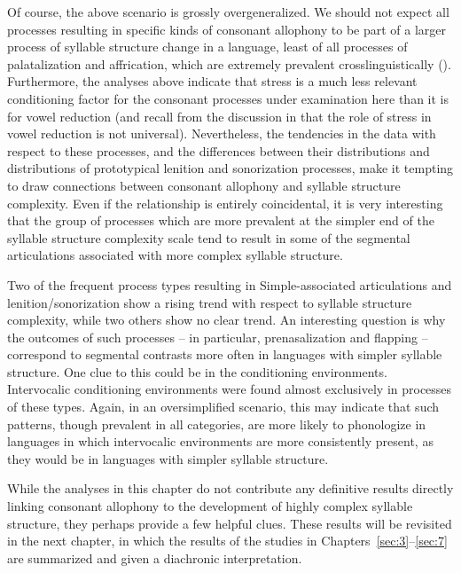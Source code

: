   Of course, the above scenario is grossly overgeneralized. We should not expect all processes resulting in specific kinds of consonant allophony to be part of a larger process of syllable structure change in a language, least of all processes of palatalization and affrication, which are extremely prevalent crosslinguistically (\citealt{Bhat1978,Bateman2007}). Furthermore, the analyses above indicate that stress is a much less relevant conditioning factor for the consonant processes under examination here than it is for vowel reduction (and recall from the discussion in  that the role of stress in vowel reduction is not universal). Nevertheless, the tendencies in the data with respect to these processes, and the differences between their distributions and distributions of prototypical lenition and sonorization processes, make it tempting to draw connections between consonant allophony and syllable structure complexity. Even if the relationship is entirely coincidental, it is very interesting that the group of processes which are more prevalent at the simpler end of the syllable structure complexity scale tend to result in some of the segmental articulations associated with more complex syllable structure.

  Two of the frequent process types resulting in Simple-associated articulations and lenition/sonorization show a rising trend with respect to syllable structure complexity, while two others show no clear trend. An interesting question is why the outcomes of such processes -- in particular, prenasalization and flapping -- correspond to segmental contrasts more often in languages with simpler syllable structure. One clue to this could be in the conditioning environments. Intervocalic conditioning environments were found almost exclusively in processes of these types. Again, in an oversimplified scenario, this may indicate that such patterns, though prevalent in all categories, are more likely to phonologize in languages in which intervocalic environments are more consistently present, as they would be in languages with simpler syllable structure.

  While the analyses in this chapter do not contribute any definitive results directly linking consonant allophony to the development of highly complex syllable structure, they perhaps provide a few helpful clues. These results will be revisited in the next chapter, in which the results of the studies in Chapters~\ref{sec:3}--\ref{sec:7} are summarized and given a diachronic interpretation.

